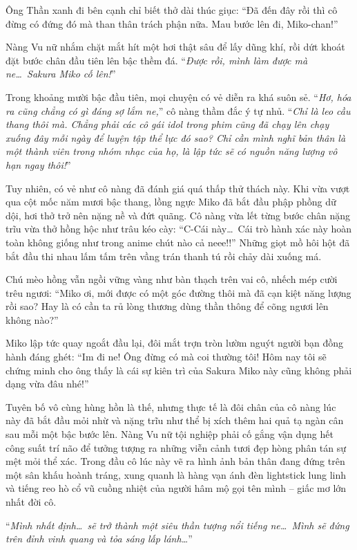 \documentclass[../main.tex]{subfiles}
\begin{document}
Ông Thần xanh đi bên cạnh chỉ biết thở dài thúc giục: ``Đã đến đây rồi thì cô đừng có đứng đó mà than thân trách phận nữa. Mau bước lên đi, Miko-chan!''

Nàng Vu nữ nhắm chặt mắt hít một hơi thật sâu để lấy dũng khí, rồi dứt khoát đặt bước chân đầu tiên lên bậc thềm đá. ``\textit{Được rồi, mình làm được mà ne\dots\ Sakura Miko cố lên!}''

Trong khoảng mười bậc đầu tiên, mọi chuyện có vẻ diễn ra khá suôn sẻ. ``\textit{Hơ, hóa ra cũng chẳng có gì đáng sợ lắm ne,}'' cô nàng thầm đắc ý tự nhủ. ``\textit{Chỉ là leo cầu thang thôi mà. Chẳng phải các cô gái idol trong phim cũng đã chạy lên chạy xuống đây mỗi ngày để luyện tập thể lực đó sao? Chỉ cần mình nghĩ bản thân là một thành viên trong nhóm nhạc của họ, là lập tức sẽ có nguồn năng lượng vô hạn ngay thôi!}''

Tuy nhiên, có vẻ như cô nàng đã đánh giá quá thấp thử thách này. Khi vừa vượt qua cột mốc năm mươi bậc thang, lồng ngực Miko đã bắt đầu phập phồng dữ dội, hơi thở trở nên nặng nề và đứt quãng. Cô nàng vừa lết từng bước chân nặng trĩu vừa thở hồng hộc như trâu kéo cày: ``C-Cái này\dots\ Cái trò hành xác này hoàn toàn không giống như trong anime chút nào cả neee!!'' Những giọt mồ hôi hột đã bắt đầu thi nhau lấm tấm trên vầng trán thanh tú rồi chảy dài xuống má.

Chú mèo hồng vẫn ngồi vững vàng như bàn thạch trên vai cô, nhếch mép cười trêu ngươi: ``Miko ơi, mới được có một góc đường thôi mà đã cạn kiệt năng lượng rồi sao? Hay là có cần ta rủ lòng thương dùng thần thông để cõng ngươi lên không nào?''

Miko lập tức quay ngoắt đầu lại, đôi mắt trợn tròn lườm nguýt người bạn đồng hành đáng ghét: ``Im đi ne! Ông đừng có mà coi thường tôi! Hôm nay tôi sẽ chứng minh cho ông thấy là cái sự kiên trì của Sakura Miko này cũng không phải dạng vừa đâu nhé!''

Tuyên bố vô cùng hùng hồn là thế, nhưng thực tế là đôi chân của cô nàng lúc này đã bắt đầu mỏi nhừ và nặng trĩu như thể bị xích thêm hai quả tạ ngàn cân sau mỗi một bậc bước lên. Nàng Vu nữ tội nghiệp phải cố gắng vận dụng hết công suất trí não để tưởng tượng ra những viễn cảnh tươi đẹp hòng phân tán sự mệt mỏi thể xác. Trong đầu cô lúc này vẽ ra hình ảnh bản thân đang đứng trên một sân khấu hoành tráng, xung quanh là hàng vạn ánh đèn lightstick lung linh và tiếng reo hò cổ vũ cuồng nhiệt của người hâm mộ gọi tên mình -- giấc mơ lớn nhất đời cô.

``\textit{Mình nhất định\dots\ sẽ trở thành một siêu thần tượng nổi tiếng ne\dots\ Mình sẽ đứng trên đỉnh vinh quang và tỏa sáng lấp lánh\dots}''
\end{document}
